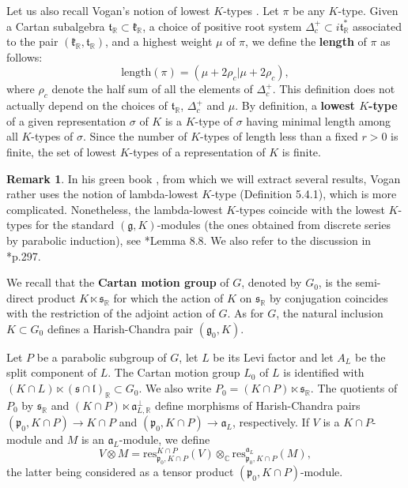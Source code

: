 \documentclass{amsart}
\theoremstyle{definition}
\newtheorem{remark}[theorem]{Remark}
\begin{document}
Let us also recall Vogan's notion of lowest $K$-types . Let $\pi$ be any $K$-type. Given a Cartan subalgebra $\mathfrak{t}_\mathbb{R} \subset \mathfrak{k}_\mathbb{R}$, a choice of positive root system $\Delta^+_c \subset i\mathfrak{t}_\mathbb{R}^*$ associated to the pair $(\mathfrak{k}_\mathbb{R}, \mathfrak{t}_\mathbb{R})$, and a highest weight $\mu$ of $\pi$, we define the \textbf{length} of $\pi$ as follows:
\[\mathrm{length}(\pi) = (\mu + 2\rho_c | \mu + 2\rho_c),\]
where $\rho_c$ denote the half sum of all the elements of $\Delta^+_c$. This definition does not actually depend on the choices of $\mathfrak{t}_\mathbb{R}$, $\Delta^+_c$ and $\mu$. By definition, a \textbf{lowest $K$-type} of a given representation $\sigma$ of $K$ is a $K$-type of $\sigma$ having minimal length among all $K$-types of $\sigma$. Since the number of $K$-types of length less than a fixed $r >0 $ is finite, the set of lowest $K$-types of a representation of $K$ is finite.

\begin{remark}
    In his green book \cite{VoganGreen}, from which we will extract several results, Vogan rather uses the notion of lambda-lowest $K$-type (Definition 5.4.1), which is more complicated. Nonetheless, the lambda-lowest $K$-types coincide with the lowest $K$-types for the standard $(\mathfrak{g},K)$-modules (the ones obtained from discrete series by parabolic induction), see \cite{VoganAnnals}*{Lemma 8.8}. We also refer to the discussion in \cite{VoganGreen}*{p.297}.
\end{remark}

We recall that the \textbf{Cartan motion group} of $G$, denoted by $G_0$, is the semi-direct product $K \ltimes \mathfrak{s}_\mathbb{R}$ for which the action of $K$ on $\mathfrak{s}_\mathbb{R}$ by conjugation coincides with the restriction of the adjoint action of $G$. As for $G$, the natural inclusion $K \subset G_0$ defines a Harish-Chandra pair $(\mathfrak{g}_0, K)$.

Let $P$ be a parabolic subgroup of $G$, let $L$ be its Levi factor and let $A_L$ be the split component of $L$. The Cartan motion group $L_0$ of $L$ is identified with $(K\cap L) \ltimes (\mathfrak{s}\cap \mathfrak{l})_\mathbb{R} \subset G_0$. We also write $P_0 = (K\cap P) \ltimes \mathfrak{s}_\mathbb{R}$. The quotients of $P_0$ by $\mathfrak{s}_\mathbb{R}$ and $(K\cap P) \ltimes \mathfrak{a}_{L,\mathbb{R}}^\perp$ define morphisms of Harish-Chandra pairs $(\mathfrak{p}_0,K\cap P) \to K\cap P$ and $(\mathfrak{p}_0,K\cap P) \to \mathfrak{a}_L$, respectively. If $V$ is a $K\cap P$-module and $M$ is an $\mathfrak{a}_L$-module, we define
\begin{equation}\label{tensor_prod_module_2}
    V \otimes M = \mathrm{res}^{K\cap P}_{\mathfrak{p}_0,K\cap P}(V) \otimes_\mathbb{C} \mathrm{res}_{\mathfrak{p}_0,K\cap P}^{\mathfrak{a}_L}(M),
\end{equation}
the latter being considered as a tensor product $(\mathfrak{p}_0, K\cap P)$-module.
\end{document}
